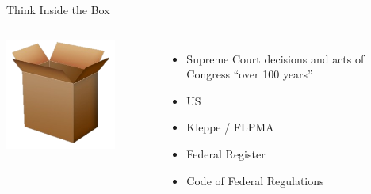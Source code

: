\begin{frame}{Think Inside the Box}
    \begin{columns}[onlytextwidth]
            \centering
            \includegraphics[width=0.75\textwidth]{img/box.png} \\

            \begin{itemize}
                \item Supreme Court decisions and acts of Congress ``over 100 years''
                \pause
                \item US
                \pause
                \item Kleppe / FLPMA
                \pause
                \item Federal Register
                \pause
                \item Code of Federal Regulations
            \end{itemize}
    \end{columns}
\end{frame}

